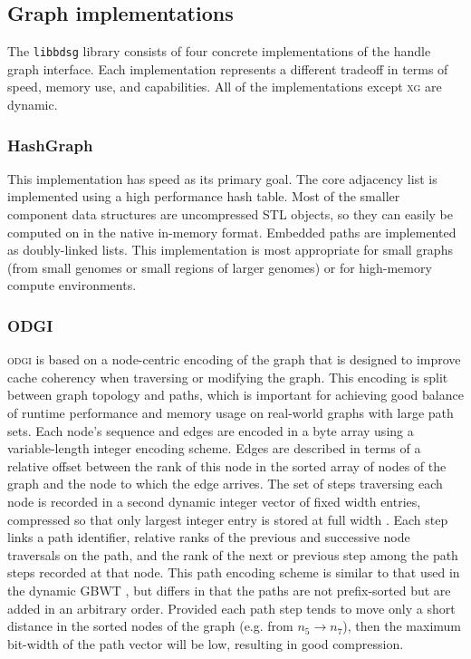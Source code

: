 \documentclass{article}
\begin{document}
\subsection{Graph implementations}

The \texttt{libbdsg} library consists of four concrete implementations of the handle graph interface.
Each implementation represents a different tradeoff in terms of speed, memory use, and capabilities.
All of the implementations except \textsc{xg} are dynamic. 

\subsubsection{HashGraph}

This implementation has speed as its primary goal.
The core adjacency list is implemented using a high performance hash table.
Most of the smaller component data structures are uncompressed STL objects, so they can easily be computed on in the native in-memory format.
Embedded paths are implemented as doubly-linked lists.
This implementation is most appropriate for small graphs (from small genomes or small regions of larger genomes) or for high-memory compute environments.

\subsubsection{ODGI}

\textsc{odgi} is based on a node-centric encoding of the graph that is designed to improve cache coherency when traversing or modifying the graph.
This encoding is split between graph topology and paths, which is important for achieving good balance of runtime performance and memory usage on real-world graphs with large path sets.
Each node's sequence and edges are encoded in a byte array using a variable-length integer encoding scheme.
Edges are described in terms of a relative offset between the rank of this node in the sorted array of nodes of the graph and the node to which the edge arrives.
The set of steps traversing each node is recorded in a second dynamic integer vector of fixed width entries, compressed so that only largest integer entry is stored at full width \cite{prezza2017framework}.
Each step links a path identifier, relative ranks of the previous and successive node traversals on the path, and the rank of the next or previous step among the path steps recorded at that node.
This path encoding scheme is similar to that used in the dynamic GBWT \cite{Siren_2019}, but differs in that the paths are not prefix-sorted but are added in an arbitrary order.
Provided each path step tends to move only a short distance in the sorted nodes of the graph (e.g. from $n_{5} \to n_{7}$), then the maximum bit-width of the path vector will be low, resulting in good compression.
\end{document}
